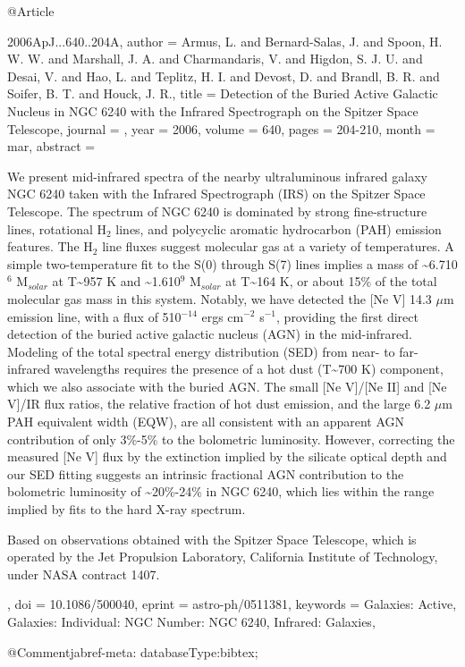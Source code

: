 \documentclass[longauth]{aa}
\begin{document}
{{{{{{{{{{@Article{2006ApJ...640..204A,
  author   = {Armus, L. and Bernard-Salas, J. and Spoon, H. W. W. and Marshall, J. A. and Charmandaris, V. and Higdon, S. J. U. and Desai, V. and Hao, L. and Teplitz, H. I. and Devost, D. and Brandl, B. R. and Soifer, B. T. and Houck, J. R.},
  title    = {Detection of the Buried Active Galactic Nucleus in NGC 6240 with the Infrared Spectrograph on the Spitzer Space Telescope},
  journal  = {\apj},
  year     = {2006},
  volume   = {640},
  pages    = {204-210},
  month    = mar,
  abstract = {We present mid-infrared spectra of the nearby ultraluminous infrared
galaxy NGC 6240 taken with the Infrared Spectrograph (IRS) on the
Spitzer Space Telescope. The spectrum of NGC 6240 is dominated by strong
fine-structure lines, rotational H$_{2}$ lines, and polycyclic
aromatic hydrocarbon (PAH) emission features. The H$_{2}$ line
fluxes suggest molecular gas at a variety of temperatures. A simple
two-temperature fit to the S(0) through S(7) lines implies a mass of
\~{}6.7{\times}10$^{6}$ M$_{solar}$ at T\~{}957 K and
\~{}1.6{\times}10$^{9}$ M$_{solar}$ at T\~{}164 K, or about 15\% of
the total molecular gas mass in this system. Notably, we have detected
the [Ne V] 14.3 {$\mu$}m emission line, with a flux of
5{\times}10$^{-14}$ ergs cm$^{-2}$ s$^{-1}$, providing
the first direct detection of the buried active galactic nucleus (AGN)
in the mid-infrared. Modeling of the total spectral energy distribution
(SED) from near- to far-infrared wavelengths requires the presence of a
hot dust (T\~{}700 K) component, which we also associate with the buried
AGN. The small [Ne V]/[Ne II] and [Ne V]/IR flux ratios, the relative
fraction of hot dust emission, and the large 6.2 {$\mu$}m PAH equivalent
width (EQW), are all consistent with an apparent AGN contribution of
only 3\%-5\% to the bolometric luminosity. However, correcting the
measured [Ne V] flux by the extinction implied by the silicate optical
depth and our SED fitting suggests an intrinsic fractional AGN
contribution to the bolometric luminosity of \~{}20\%-24\% in NGC 6240, which
lies within the range implied by fits to the hard X-ray spectrum.

Based on observations obtained with the Spitzer Space Telescope, which
is operated by the Jet Propulsion Laboratory, California Institute of
Technology, under NASA contract 1407.
},
  doi      = {10.1086/500040},
  eprint   = {astro-ph/0511381},
  keywords = {Galaxies: Active, Galaxies: Individual: NGC Number: NGC 6240, Infrared: Galaxies},
}

@Comment{jabref-meta: databaseType:bibtex;}
 


}}}}}}}}}}
\end{document}
